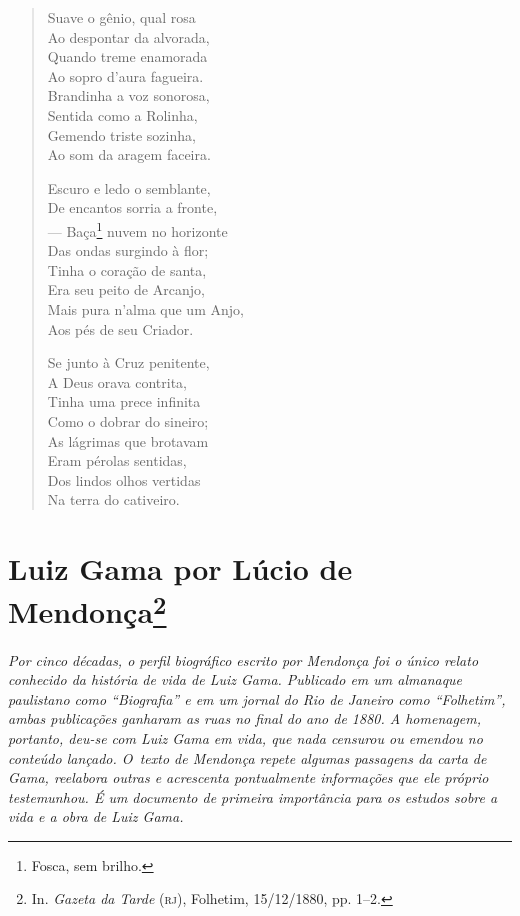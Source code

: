 \begin{verse}
Suave o gênio, qual rosa\\
Ao despontar da alvorada,\\
Quando treme enamorada\\
Ao sopro d'aura fagueira.\\
Brandinha a voz sonorosa,\\
Sentida como a Rolinha,\\
Gemendo triste sozinha,\\
Ao som da aragem faceira.

Escuro e ledo o semblante,\\
De encantos sorria a fronte,\\
--- Baça\footnote{Fosca, sem brilho.} nuvem no horizonte\\
Das ondas surgindo à flor;\\
Tinha o coração de santa,\\
Era seu peito de Arcanjo,\\
Mais pura n'alma que um Anjo,\\
Aos pés de seu Criador.

Se junto à Cruz penitente,\\
A Deus orava contrita,\\
Tinha uma prece infinita\\
Como o dobrar do sineiro;\\
As lágrimas que brotavam\\
Eram pérolas sentidas,\\
Dos lindos olhos vertidas\\
Na terra do cativeiro.
\end{verse}


\chapter{Luiz Gama por Lúcio de Mendonça\footnote{In.
  \emph{Gazeta da Tarde} (\textsc{rj}), Folhetim, 15/12/1880, pp. 1--2.}}

\begin{resumo}
\emph{Por cinco décadas, o perfil biográfico escrito por Mendonça foi o
único relato conhecido da história de vida de Luiz Gama. Publicado em um
almanaque paulistano como ``Biografia'' e em um jornal do Rio de Janeiro
como ``Folhetim'', ambas publicações ganharam as ruas no final do ano de
1880. A homenagem, portanto, deu-se com Luiz Gama em vida, que nada
censurou ou emendou no conteúdo lançado. O~texto de Mendonça repete
algumas passagens da carta de Gama, reelabora outras e acrescenta
pontualmente informações que ele próprio testemunhou. É um documento de
primeira importância para os estudos sobre a vida e a obra de Luiz Gama.
}
\end{resumo}

